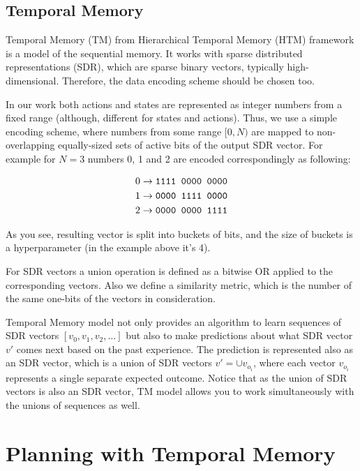 \documentclass[runningheads]{llncs}
\begin{document}
\subsection{Temporal Memory}

Temporal Memory (TM) from Hierarchical Temporal Memory (HTM) framework is a model of the sequential memory. It works with sparse distributed representations (SDR), which are sparse binary vectors, typically high-dimensional. Therefore, the data encoding scheme should be chosen too.

In our work both actions and states are represented as integer numbers from a fixed range (although, different for states and actions). Thus, we use a simple encoding scheme, where numbers from some range $[0, N)$ are mapped to non-overlapping equally-sized sets of active bits of the output SDR vector. For example for $N = 3$ numbers 0, 1 and 2 are encoded correspondingly as following:

$$
\begin{aligned}
  0 & \rightarrow \verb|1111 0000 0000| \\
  1 & \rightarrow \verb|0000 1111 0000| \\
  2 & \rightarrow \verb|0000 0000 1111| \\
\end{aligned}
$$

As you see, resulting vector is split into buckets of bits, and the size of buckets is a hyperparameter (in the example above it's 4).

For SDR vectors a union operation is defined as a bitwise OR applied to the corresponding vectors. Also we define a similarity metric, which is the number of the same one-bits of the vectors in consideration.

Temporal Memory model not only provides an algorithm to learn sequences of SDR vectors $[v_0, v_1, v_2, \dots ]$ but also to make predictions about what SDR vector $v'$ comes next based on the past experience. The prediction is represented also as an SDR vector, which is a union of SDR vectors $v' = \cup v_{o_i}$, where each vector $v_{o_i}$ represents a single separate expected outcome. Notice that as the union of SDR vectors is also an SDR vector, TM model allows you to work simultaneously with the unions of sequences as well.

\section{Planning with Temporal Memory}
\end{document}
